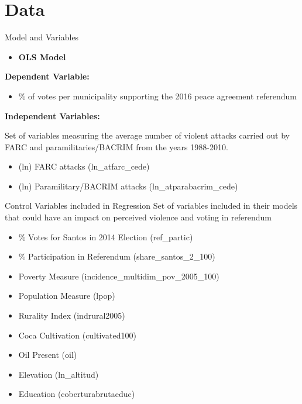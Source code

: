 \documentclass{beamer}
\begin{document}
	\section{Data}
	
	\begin{frame}{Model and Variables}
		\begin{itemize}
			\item \textbf{OLS Model}
		\end{itemize}
			\textbf{Dependent Variable:}
		\begin{itemize}
			\item \% of votes per municipality supporting the 2016 peace agreement referendum
		\end{itemize}
		
		\textbf{Independent Variables:}
		
		\noindent Set of variables measuring the average number of violent attacks carried out by FARC and paramilitaries/BACRIM from the years 1988-2010.
		\begin{itemize}
			\item (ln) FARC attacks (ln\_atfarc\_cede)
			\item (ln) Paramilitary/BACRIM attacks (ln\_atparabacrim\_cede)
		\end{itemize}
		
	\end{frame}
	
	\begin{frame}{Control Variables included in Regression}
			\noindent Set of variables included in their models that could have an impact on perceived violence and voting in referendum 
		\begin{itemize}
			\item \% Votes for Santos in 2014 Election (ref\_partic)
			\item \% Participation in Referendum (share\_santos\_2\_100)
			\item Poverty Measure (incidence\_multidim\_pov\_2005\_100)
			\item Population Measure (lpop)
			\item Rurality Index (indrural2005)
			\item Coca Cultivation (cultivated100)
			\item Oil Present (oil)
			\item Elevation (ln\_altitud)
			\item Education (coberturabrutaeduc)
		\end{itemize}
	\end{frame}
	
\end{document}

